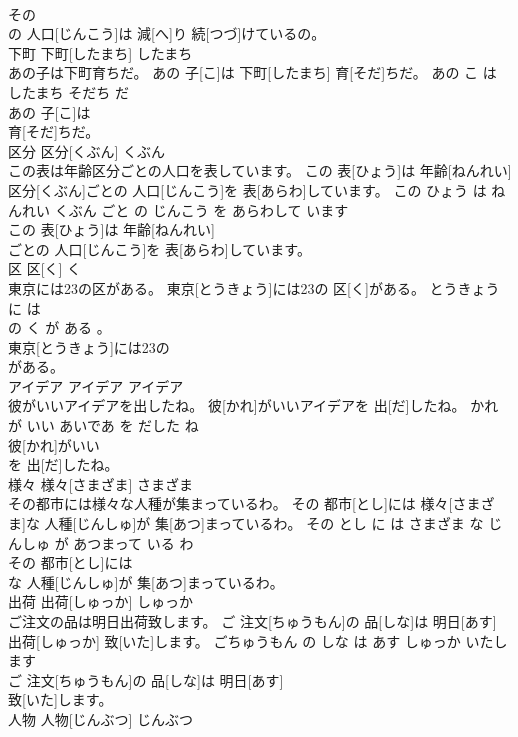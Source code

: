 \documentclass[8pt]{extreport}
\begin{document}
\begin{CJK}{UTF8}{min}
\\	その
\\	の 人口[じんこう]は 減[へ]り 続[つづ]けているの。			
\\	下町	下町[したまち]	したまち	
\\	あの子は下町育ちだ。	あの 子[こ]は 下町[したまち] 育[そだ]ちだ。	あの こ は したまち そだち だ	
\\	あの 子[こ]は
\\	育[そだ]ちだ。			
\\	区分	区分[くぶん]	くぶん	
\\	この表は年齢区分ごとの人口を表しています。	この 表[ひょう]は 年齢[ねんれい] 区分[くぶん]ごとの 人口[じんこう]を 表[あらわ]しています。	この ひょう は ねんれい くぶん ごと の じんこう を あらわして います	
\\	この 表[ひょう]は 年齢[ねんれい]
\\	ごとの 人口[じんこう]を 表[あらわ]しています。			
\\	区	区[く]	く	
\\	東京には23の区がある。	東京[とうきょう]には23の 区[く]がある。	とうきょう に は 
\\	の く が ある 。	
\\	東京[とうきょう]には23の
\\	がある。			
\\	アイデア	アイデア	アイデア	
\\	彼がいいアイデアを出したね。	彼[かれ]がいいアイデアを 出[だ]したね。	かれ が いい あいであ を だした ね	
\\	彼[かれ]がいい
\\	を 出[だ]したね。			
\\	様々	様々[さまざま]	さまざま	
\\	その都市には様々な人種が集まっているわ。	その 都市[とし]には 様々[さまざま]な 人種[じんしゅ]が 集[あつ]まっているわ。	その とし に は さまざま な じんしゅ が あつまって いる わ	
\\	その 都市[とし]には
\\	な 人種[じんしゅ]が 集[あつ]まっているわ。			
\\	出荷	出荷[しゅっか]	しゅっか	
\\	ご注文の品は明日出荷致します。	ご 注文[ちゅうもん]の 品[しな]は 明日[あす] 出荷[しゅっか] 致[いた]します。	ごちゅうもん の しな は あす しゅっか いたします	
\\	ご 注文[ちゅうもん]の 品[しな]は 明日[あす]
\\	致[いた]します。			
\\	人物	人物[じんぶつ]	じんぶつ	

\end{CJK}
\end{document}
